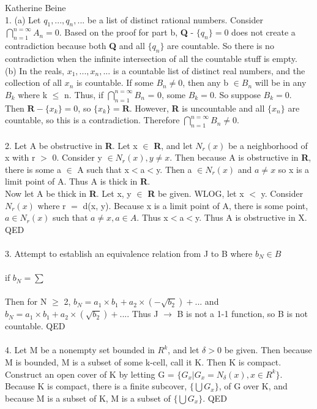 \documentclass{article}
\begin{document}
Katherine Beine \\
1.  (a)  Let $q_{1},...,q_{n},...$ be a list of distinct rational numbers. Consider  $\bigcap_{n=1}^{n=\infty} A_{n} = 0$.   Based on the proof for part b, \textbf{Q} - $\lbrace q_{n} \rbrace = 0$ does not create a contradiction because both \textbf{Q} and all $\lbrace q_{n} \rbrace$ are countable.  So there is no contradiction when the infinite intersection of all the countable stuff is empty.  \\
(b) In the reals, $x_{1},...,x_{n},...$ is a countable list of distinct real numbers, and the collection of all $x_{n}$ is countable.  If some $B_{n} \neq 0$, then any b $\in B_{n}$ will be in any $B_{k}$ where k $\leq$ n.  Thus, if $\bigcap_{n=1}^{n=\infty} B_{n}$ = 0, some $B_{k} = 0$.  So suppose $B_{k} = 0$.  Then $\textbf{R} - \lbrace x_{k} \rbrace = 0$, so $ \lbrace x_{k} \rbrace = \textbf{R}$.  However, \textbf{R} is uncountable and all $\lbrace x_{n} \rbrace$ are countable, so this is a contradiction.  Therefore $\bigcap_{n=1}^{n=\infty} B_{n} \neq 0$.  \\
\\
2.  Let A be obstructive in \textbf{R}.  Let x $\in$ \textbf{R}, and let $N_{r}(x)$ be a neighborhood of x with r $>$ 0.  Consider y $\in N_{r}(x), y \neq x$.  Then because A is obstructive in \textbf{R}, there is some a $\in$ A such that x$<$a$<$y.  Then a $\in N_{r}(x)$ and $a \neq x$ so x is a limit point of A.  Thus A is thick in \textbf{R}.\\
Now let A be thick in \textbf{R}.  Let x, y $\in$ \textbf{R} be given.  WLOG, let x $<$ y.  Consider $N_{r}(x)$ where r $=$ d(x, y).  Because x is a limit point of A, there is some point, $a \in N_{r}(x)$ such that $a \neq x, a \in A$.  Thus x$<$a$<$y.  Thus A is obstructive in X.  QED\\
\\
3.  Attempt to establish an equivalence relation from J to B where $b_{N} \in B$\\ \\if $b_{N} =\sum$\\
\\Then for N $\geq$ 2, $b_{N} = a_{1} \times b_{1} + a_{2} \times (-\sqrt{b_{2}}) + ...$ and $b_{N} = a_{1} \times b_{1} + a_{2} \times (\sqrt{b_{2}}) + ...$.  Thus J $\rightarrow$ B is not a 1-1 function, so B is not countable.  QED\\
\\
4.  Let M be a nonempty set bounded in \textbf{$R^{k}$}, and let $\delta > 0$ be given.  Then because M is bounded, M is a subset of some k-cell, call it K.  Then K is compact.  Construct an open cover of K by letting G = $\lbrace G_{x} | G_{x} = N_{\delta}(x), x \in R^{k} \rbrace$.  Because K is compact, there is a finite subcover, $\lbrace \bigcup G_{x} \rbrace$, of G over K, and because M is a subset of K, M is a subset of $\lbrace \bigcup G_{x} \rbrace$.  QED\\ 
\end{document}
